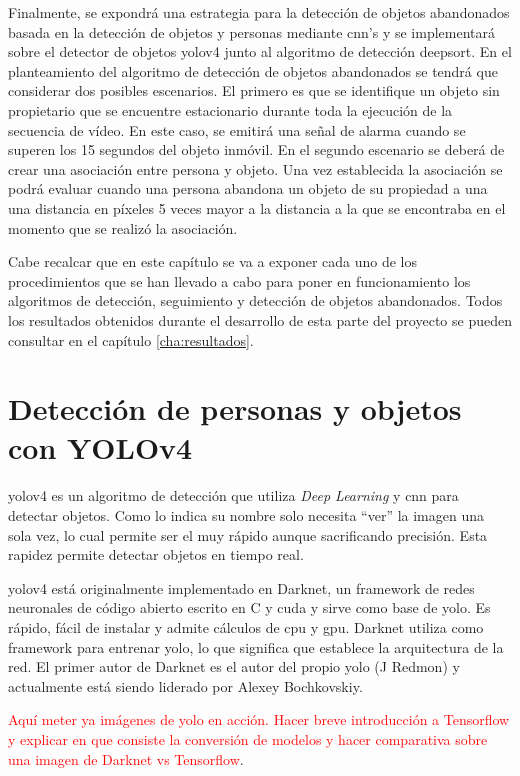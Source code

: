 Finalmente, se expondrá una estrategia para la detección de objetos abandonados basada en la detección de objetos y personas mediante \gls{cnn}'s y se implementará sobre el detector de objetos \gls{yolov4} junto al algoritmo de detección \gls{deepsort}. En el planteamiento del algoritmo de detección de objetos abandonados se tendrá que considerar dos posibles escenarios. El primero es que se identifique un objeto sin propietario que se encuentre estacionario durante toda la ejecución de la secuencia de vídeo. En este caso, se emitirá una señal de alarma cuando se superen los 15 segundos del objeto inmóvil. En el segundo escenario se deberá de crear una asociación entre persona y objeto. Una vez establecida la asociación se podrá evaluar cuando una persona abandona un objeto de su propiedad a una una distancia en píxeles 5 veces mayor a la distancia a la que se encontraba en el momento que se realizó la asociación.

Cabe recalcar que en este capítulo se va a exponer cada uno de los procedimientos que se han llevado a cabo para poner en funcionamiento los algoritmos de detección, seguimiento y detección de objetos abandonados. Todos los resultados obtenidos durante el desarrollo de esta parte del proyecto se pueden consultar en el capítulo \ref{cha:resultados}.

\section{Detección de personas y objetos con YOLOv4}
\label{sec:desarrollo-yolov4}

\gls{yolov4} es un algoritmo de detección que utiliza \textit{Deep Learning} y \gls{cnn} para detectar objetos. Como lo indica su nombre solo necesita ``ver'' la imagen una sola vez, lo cual permite ser el muy rápido aunque sacrificando precisión. Esta rapidez permite detectar objetos en tiempo real.

\gls{yolov4} está originalmente implementado en Darknet, un framework de redes neuronales de código abierto escrito en C y \gls{cuda} y sirve como base de \gls{yolo}. Es rápido, fácil de instalar y admite cálculos de \gls{cpu} y \gls{gpu}. Darknet utiliza como framework para entrenar \gls{yolo}, lo que significa que establece la arquitectura de la red. El primer autor de Darknet es el autor del propio \gls{yolo} (J Redmon) y actualmente está siendo liderado por Alexey Bochkovskiy.

\textcolor{red}{Aquí meter ya imágenes de yolo en acción. Hacer breve introducción a Tensorflow y explicar en que consiste la conversión de modelos y hacer comparativa sobre una imagen de Darknet vs Tensorflow}.

